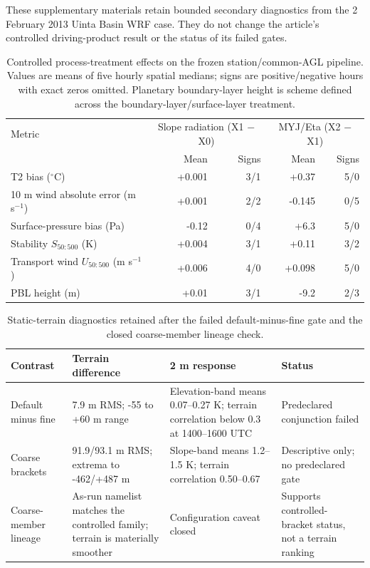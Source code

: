 \documentclass[air,article,submit,moreauthors]{Definitions/mdpi}
\begin{document}
These supplementary materials retain bounded secondary diagnostics from the 2 February 2013 Uinta Basin WRF case.
They do not change the article's controlled driving-product result or the status of its failed gates.

\begin{table}[H]
\caption{Controlled process-treatment effects on the frozen station/common-AGL pipeline.
Values are means of five hourly spatial medians; signs are positive/negative hours with exact zeros omitted.
Planetary boundary-layer height is scheme defined across the boundary-layer/surface-layer treatment.}
\label{tab:s1-process-effects}
\centering
\footnotesize
\begin{tabular}{lrrrr}
\toprule
Metric & \multicolumn{2}{c}{Slope radiation (X1 $-$ X0)} & \multicolumn{2}{c}{MYJ/Eta (X2 $-$ X1)} \\
 & Mean & Signs & Mean & Signs \\
\midrule
T2 bias ($^{\circ}$C) & +0.001 & 3/1 & +0.37 & 5/0 \\
10 m wind absolute error (m s$^{-1}$) & +0.001 & 2/2 & -0.145 & 0/5 \\
Surface-pressure bias (Pa) & -0.12 & 0/4 & +6.3 & 5/0 \\
Stability $S_{50:500}$ (K) & +0.004 & 3/1 & +0.11 & 3/2 \\
Transport wind $U_{50:500}$ (m s$^{-1}$) & +0.006 & 4/0 & +0.098 & 5/0 \\
PBL height (m) & +0.01 & 3/1 & -9.2 & 2/3 \\
\bottomrule
\end{tabular}
\end{table}

\begin{table}[H]
\caption{Static-terrain diagnostics retained after the failed default-minus-fine gate and the closed coarse-member lineage check.}
\label{tab:s2-terrain-summary}
\centering
\small
\begin{tabularx}{\textwidth}{lXXX}
\toprule
Contrast & Terrain difference & 2 m response & Status \\
\midrule
Default minus fine & 7.9 m RMS; -55 to +60 m range & Elevation-band means 0.07--0.27 K; terrain correlation below 0.3 at 1400--1600 UTC & Predeclared conjunction failed \\
Coarse brackets & 91.9/93.1 m RMS; extrema to -462/+487 m & Slope-band means 1.2--1.5 K; terrain correlation 0.50--0.67 & Descriptive only; no predeclared gate \\
Coarse-member lineage & As-run namelist matches the controlled family; terrain is materially smoother & Configuration caveat closed & Supports controlled-bracket status, not a terrain ranking \\
\bottomrule
\end{tabularx}
\end{table}
\end{document}
